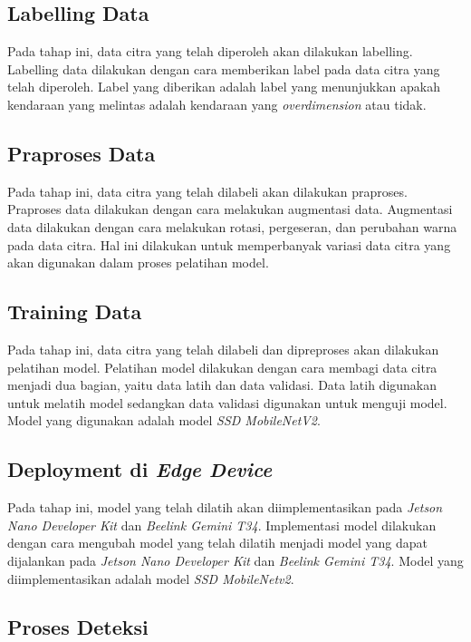 \subsection{Labelling Data}

Pada tahap ini, data citra yang telah diperoleh akan dilakukan labelling. Labelling data dilakukan dengan cara memberikan label pada data citra yang telah diperoleh. Label yang diberikan adalah label yang menunjukkan apakah kendaraan yang melintas adalah kendaraan yang \emph{overdimension} atau tidak.

\subsection{Praproses Data}

Pada tahap ini, data citra yang telah dilabeli akan dilakukan praproses. Praproses data dilakukan dengan cara melakukan augmentasi data. Augmentasi data dilakukan dengan cara melakukan rotasi, pergeseran, dan perubahan warna pada data citra. Hal ini dilakukan untuk memperbanyak variasi data citra yang akan digunakan dalam proses pelatihan model.

\subsection{Training Data}

Pada tahap ini, data citra yang telah dilabeli dan dipreproses akan dilakukan pelatihan model. Pelatihan model dilakukan dengan cara membagi data citra menjadi dua bagian, yaitu data latih dan data validasi. Data latih digunakan untuk melatih model sedangkan data validasi digunakan untuk menguji model. Model yang digunakan adalah model \emph{SSD MobileNetV2}.

\subsection{Deployment di \emph{Edge Device}}

Pada tahap ini, model yang telah dilatih akan diimplementasikan pada \emph{Jetson Nano Developer Kit} dan \emph{Beelink Gemini T34}. Implementasi model dilakukan dengan cara mengubah model yang telah dilatih menjadi model yang dapat dijalankan pada \emph{Jetson Nano Developer Kit} dan \emph{Beelink Gemini T34}. Model yang diimplementasikan adalah model \emph{SSD MobileNetv2}.

\subsection{Proses Deteksi}


